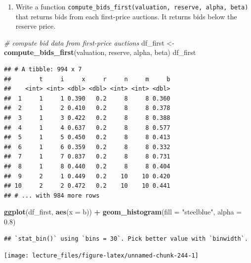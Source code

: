 \documentclass[]{book}
\newenvironment{Shaded}{\begin{snugshade}}{\end{snugshade}}
\newcommand{\KeywordTok}[1]{\textcolor[rgb]{0.13,0.29,0.53}{\textbf{#1}}}
\newcommand{\DataTypeTok}[1]{\textcolor[rgb]{0.13,0.29,0.53}{#1}}
\newcommand{\FloatTok}[1]{\textcolor[rgb]{0.00,0.00,0.81}{#1}}
\newcommand{\StringTok}[1]{\textcolor[rgb]{0.31,0.60,0.02}{#1}}
\newcommand{\CommentTok}[1]{\textcolor[rgb]{0.56,0.35,0.01}{\textit{#1}}}
\newcommand{\OperatorTok}[1]{\textcolor[rgb]{0.81,0.36,0.00}{\textbf{#1}}}
\newcommand{\NormalTok}[1]{#1}
\providecommand{\tightlist}{%
  \setlength{\itemsep}{0pt}\setlength{\parskip}{0pt}}
\begin{document}
\begin{enumerate}
\def\labelenumi{\arabic{enumi}.}
\setcounter{enumi}{4}
\tightlist
\item
  Write a function
  \texttt{compute\_bids\_first(valuation,\ reserve,\ alpha,\ beta)} that
  returns bids from each first-price auctions. It returns bids below the
  reserve price.
\end{enumerate}

\begin{Shaded}
\begin{Highlighting}[]
\CommentTok{# compute bid data from first-price auctions}
\NormalTok{df_first <-}\StringTok{ }\KeywordTok{compute_bids_first}\NormalTok{(valuation, reserve, alpha, beta)}
\NormalTok{df_first}
\end{Highlighting}
\end{Shaded}

\begin{verbatim}
## # A tibble: 994 x 7
##        t     i     x     r     n     m     b
##    <int> <int> <dbl> <dbl> <int> <int> <dbl>
##  1     1     1 0.390   0.2     8     8 0.360
##  2     1     2 0.410   0.2     8     8 0.378
##  3     1     3 0.422   0.2     8     8 0.388
##  4     1     4 0.637   0.2     8     8 0.577
##  5     1     5 0.450   0.2     8     8 0.413
##  6     1     6 0.359   0.2     8     8 0.332
##  7     1     7 0.837   0.2     8     8 0.731
##  8     1     8 0.440   0.2     8     8 0.404
##  9     2     1 0.449   0.2    10    10 0.420
## 10     2     2 0.472   0.2    10    10 0.441
## # ... with 984 more rows
\end{verbatim}

\begin{Shaded}
\begin{Highlighting}[]
\KeywordTok{ggplot}\NormalTok{(df_first, }\KeywordTok{aes}\NormalTok{(}\DataTypeTok{x =}\NormalTok{ b)) }\OperatorTok{+}\StringTok{ }\KeywordTok{geom_histogram}\NormalTok{(}\DataTypeTok{fill =} \StringTok{"steelblue"}\NormalTok{, }\DataTypeTok{alpha =} \FloatTok{0.8}\NormalTok{)}
\end{Highlighting}
\end{Shaded}

\begin{verbatim}
## `stat_bin()` using `bins = 30`. Pick better value with `binwidth`.
\end{verbatim}

\begin{center}\texttt{[image: lecture\_files/figure-latex/unnamed-chunk-244-1]} \end{center}
\end{document}
